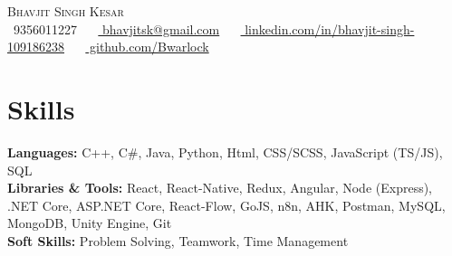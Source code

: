 \documentclass[letterpaper,11pt]{article}
\begin{document}


\begin{center}
    {\Huge \scshape Bhavjit Singh Kesar} \\ \vspace{1pt}
    \vspace{5pt}
    \small \raisebox{-0.1\height}\faPhone\ 9356011227 ~ 
    \raisebox{-0.2\height}\faEnvelope\ \href{mailto:bhavjitsk@gmail.com}{ bhavjitsk@gmail.com} ~ 
    \raisebox{-0.2\height}\faLinkedin\ \href{https://www.linkedin.com/in/bhavjit-singh-109186238}{ linkedin.com/in/bhavjit-singh-109186238}  ~
    \raisebox{-0.2\height}\faGithub\ \href{https://github.com/Bwarlock}{ github.com/Bwarlock}
    \vspace{-8pt}
\end{center}

\section{Skills}
 \begin{itemize}[leftmargin=0.15in, label={}]
    {\item{
     \textbf{Languages:}{ C++, C\#, Java, Python, Html, CSS/SCSS, JavaScript (TS/JS), SQL} \\
     \vspace{1pt}
     \textbf{Libraries \& Tools:}{ React, React-Native, Redux, Angular, Node (Express), .NET Core, ASP.NET Core, React-Flow, GoJS, n8n, AHK, Postman, MySQL, MongoDB, Unity Engine, Git} \\
     \vspace{1pt}
     \textbf{Soft Skills:}{ Problem Solving, Teamwork, Time Management} \\
    }}
 \end{itemize}
 \vspace{-16pt}
\end{document}
